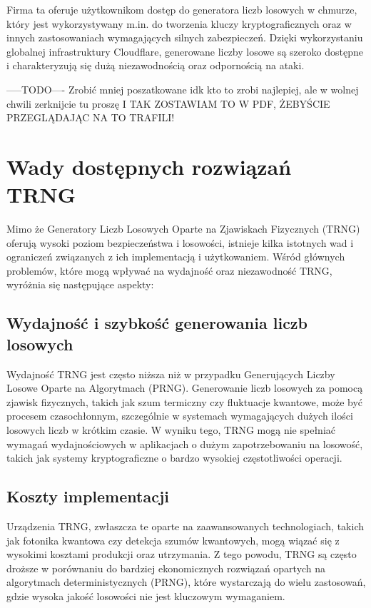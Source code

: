 Firma ta oferuje użytkownikom dostęp do generatora liczb losowych w chmurze, który jest wykorzystywany m.in. do tworzenia kluczy kryptograficznych oraz w innych zastosowaniach wymagających silnych zabezpieczeń. Dzięki wykorzystaniu globalnej infrastruktury Cloudflare, generowane liczby losowe są szeroko dostępne i charakteryzują się dużą niezawodnością oraz odpornością na ataki.


        -----TODO----
    Zrobić mniej poszatkowane
    idk kto to zrobi najlepiej, ale w wolnej chwili zerknijcie tu proszę
    I TAK ZOSTAWIAM TO W PDF, ŻEBYŚCIE PRZEGLĄDAJĄC NA TO TRAFILI!




\section{Wady dostępnych rozwiązań TRNG}

Mimo że Generatory Liczb Losowych Oparte na Zjawiskach Fizycznych (TRNG) oferują wysoki poziom bezpieczeństwa i losowości, istnieje kilka istotnych wad i ograniczeń związanych z ich implementacją i użytkowaniem. Wśród głównych problemów, które mogą wpływać na wydajność oraz niezawodność TRNG, wyróżnia się następujące aspekty:

\subsection{Wydajność i szybkość generowania liczb losowych}

Wydajność TRNG jest często niższa niż w przypadku Generujących Liczby Losowe Oparte na Algorytmach (PRNG). Generowanie liczb losowych za pomocą zjawisk fizycznych, takich jak szum termiczny czy fluktuacje kwantowe, może być procesem czasochłonnym, szczególnie w systemach wymagających dużych ilości losowych liczb w krótkim czasie. W wyniku tego, TRNG mogą nie spełniać wymagań wydajnościowych w aplikacjach o dużym zapotrzebowaniu na losowość, takich jak systemy kryptograficzne o bardzo wysokiej częstotliwości operacji.

\subsection{Koszty implementacji}

Urządzenia TRNG, zwłaszcza te oparte na zaawansowanych technologiach, takich jak fotonika kwantowa czy detekcja szumów kwantowych, mogą wiązać się z wysokimi kosztami produkcji oraz utrzymania. Z tego powodu, TRNG są często droższe w porównaniu do bardziej ekonomicznych rozwiązań opartych na algorytmach deterministycznych (PRNG), które wystarczają do wielu zastosowań, gdzie wysoka jakość losowości nie jest kluczowym wymaganiem.

